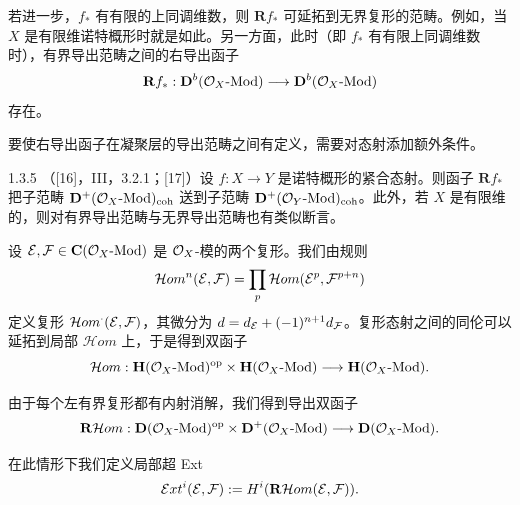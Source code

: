 若进一步，$f_{*}$ 有有限的上同调维数，则 $\mathbf{R}f_{*}$ 可延拓到无界复形的范畴。例如，当 $X$ 是有限维诺特概形时就是如此。另一方面，此时（即 $f_{*}$ 有有限上同调维数时），有界导出范畴之间的右导出函子
\begin{equation*}
\mathbf{R}f_{*}:\mathbf{D}^{b}(\mathcal{O}_X\text{-}\mathrm{Mod})\longrightarrow\mathbf{D}^{b}(\mathcal{O}_X\text{-}\mathrm{Mod})
\end{equation*}
存在。

要使右导出函子在凝聚层的导出范畴之间有定义，需要对态射添加额外条件。

\begin{proposition}{1.3.5}
（[16]，III，3.2.1；[17]）设 $f:X\to Y$ 是诺特概形的紧合态射。则函子 $\mathbf{R}f_{*}$ 把子范畴 $\mathbf{D}^{+}(\mathcal{O}_X\text{-}\mathrm{Mod})_{\mathrm{coh}}$ 送到子范畴 $\mathbf{D}^{+}(\mathcal{O}_Y\text{-}\mathrm{Mod})_{\mathrm{coh}}$。此外，若 $X$ 是有限维的，则对有界导出范畴与无界导出范畴也有类似断言。
\end{proposition}

设 $\mathcal{E},\mathcal{F}\in\mathbf{C}(\mathcal{O}_X\text{-}\mathrm{Mod})$ 是 $\mathcal{O}_X$-模的两个复形。我们由规则
\begin{equation*}
\mathcal{H}om^{n}(\mathcal{E},\mathcal{F})=\prod_{p}\mathcal{H}om(\mathcal{E}^{p},\mathcal{F}^{p+n})
\end{equation*}
定义复形 $\mathcal{H}om^{\cdot}(\mathcal{E},\mathcal{F})$，其微分为 $d=d_{\mathcal{E}}+(-1)^{n+1}d_{\mathcal{F}}$。复形态射之间的同伦可以延拓到局部 $\mathcal{H}om$ 上，于是得到双函子
\begin{equation*}
\mathcal{H}om:\mathbf{H}(\mathcal{O}_X\text{-}\mathrm{Mod})^{\mathrm{op}}\times\mathbf{H}(\mathcal{O}_X\text{-}\mathrm{Mod})\longrightarrow\mathbf{H}(\mathcal{O}_X\text{-}\mathrm{Mod}).
\end{equation*}

由于每个左有界复形都有内射消解，我们得到导出双函子
\begin{equation*}
\mathbf{R}\mathcal{H}om:\mathbf{D}(\mathcal{O}_X\text{-}\mathrm{Mod})^{\mathrm{op}}\times\mathbf{D}^{+}(\mathcal{O}_X\text{-}\mathrm{Mod})\longrightarrow\mathbf{D}(\mathcal{O}_X\text{-}\mathrm{Mod}).
\end{equation*}

在此情形下我们定义局部超 Ext
\begin{equation*}
\mathcal{E}xt^{i}(\mathcal{E},\mathcal{F}):=H^{i}(\mathbf{R}\mathcal{H}om(\mathcal{E},\mathcal{F})).
\end{equation*}

